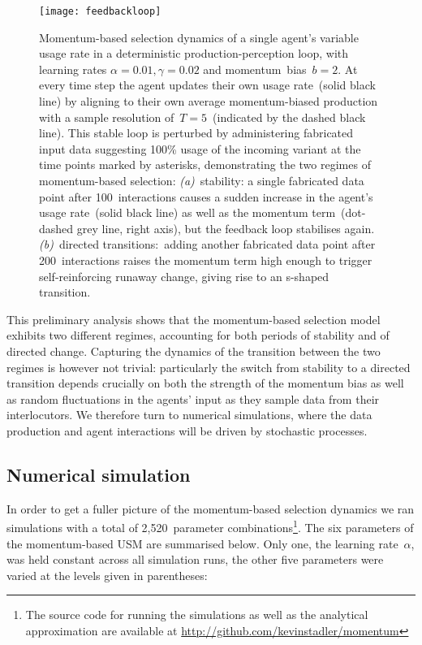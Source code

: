 \documentclass[10pt]{article}
\begin{document}
\begin{figure}
\centering
\texttt{[image: feedbackloop]}
\caption[Momentum-based selection dynamics of a single agent's usage rate in a deterministic production-perception loop]{Momentum-based selection dynamics of a single agent's variable usage rate in a deterministic production-perception loop, with learning rates $\alpha=0.01, \gamma=0.02$ and momentum~bias~$b=2$. At every time step the agent updates their own usage rate~(solid black line) by aligning to their own average momentum-biased production with a sample resolution of~$T=5$~(indicated by the dashed black line). This stable loop is perturbed by administering fabricated input data suggesting 100\% usage of the incoming variant at the time points marked by asterisks, demonstrating the two regimes of momentum-based selection: \textit{(a)}~stability: a single fabricated data point after 100~interactions causes a sudden increase in the agent's usage rate~(solid black line) as well as the momentum term~(dot-dashed grey line, right axis), but the feedback loop stabilises again. \textit{(b)}~directed transitions:~adding another fabricated data point after 200~interactions raises the momentum term high enough to trigger self-reinforcing runaway change, giving rise to an s-shaped transition.}
\label{fig:feedbackloop}
\end{figure}

This preliminary analysis shows that the momentum-based selection model exhibits two different regimes, accounting for both periods of stability and of directed change. Capturing the dynamics of the transition between the two regimes is however not trivial: particularly the switch from stability to a directed transition depends crucially on both the strength of the momentum bias as well as random fluctuations in the agents' input as they sample data from their interlocutors. We therefore turn to numerical simulations, where the data production and agent interactions will be driven by stochastic processes.

\subsection{Numerical simulation}

In order to get a fuller picture of the momentum-based selection dynamics we ran simulations with a total of 2,520~parameter combinations\footnote{The source code for running the simulations as well as the analytical approximation are available at \url{http://github.com/kevinstadler/momentum}}. The six parameters of the momentum-based USM are summarised below. Only one, the learning rate~$\alpha$, was held constant across all simulation runs, the other five parameters were varied at the levels given in parentheses:
\end{document}
